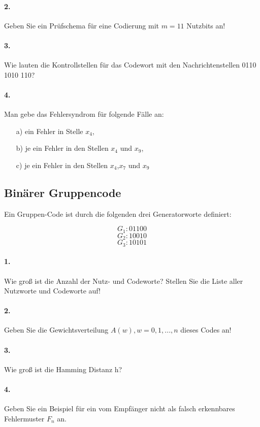 \documentclass[paper=a4, fontsize=11pt]{scrartcl}
\numberwithin{equation}{section}
\numberwithin{figure}{section}
\numberwithin{table}{section}
\begin{document}
\paragraph{2.}
Geben Sie ein Prüfschema für eine Codierung mit $m = 11$ Nutzbits an!

\paragraph{3.}
Wie lauten die Kontrollstellen für das Codewort mit den Nachrichtenstellen 0110 1010 110?

\paragraph{4.}
Man gebe das Fehlersyndrom für folgende Fälle an:
\begin{itemize}
\item[a)] ein Fehler in Stelle $x_{4}$,
\item[b)] je ein Fehler in den Stellen $x_{4}$ und $x_{9}$,
\item[c)] je ein Fehler in den Stellen $x_{4}$,$x_{7}$ und $x_{9}$
\end{itemize}

\subsection{Binärer Gruppencode}
Ein Gruppen-Code ist durch die folgenden drei Generatorworte definiert:

$$G_{1}: 01100$$
$$G_{2}: 10010$$
$$G_{3}: 10101$$

\paragraph{1.}
Wie groß ist die Anzahl der Nutz- und Codeworte? Stellen Sie die Liste aller Nutzworte und Codeworte auf!

\paragraph{2.}
Geben Sie die Gewichtsverteilung $A(w), w=0,1, ...,n$ dieses Codes an!

\paragraph{3.}
Wie groß ist die Hamming Distanz h?

\paragraph{4.}
Geben Sie ein Beispiel für ein vom Empfänger nicht als falsch erkennbares Fehlermuster $F_{n}$ an.
\end{document}
